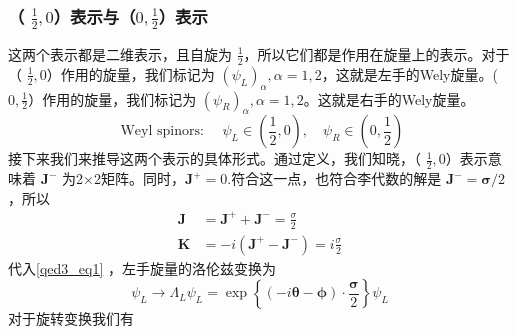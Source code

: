 \subsubsection{（ $\frac{1}{2},0$）表示与（$0,\frac{1}{2}$）表示}
这两个表示都是二维表示，且自旋为 $\frac{1}{2}$，所以它们都是作用在旋量上的表示。对于（ $\frac{1}{2},0$）作用的旋量，我们标记为 $\left(\psi_{L}\right)_{\alpha},\alpha=1,2$，这就是左手的Wely旋量。($0,\frac{1}{2}$）作用的旋量，我们标记为 $\left(\psi_{R}\right)_{\alpha},\alpha=1,2$。这就是右手的Wely旋量。
\begin{equation}
\text { Weyl spinors: } \quad \psi_{L} \in\left(\frac{1}{2}, 0\right), \quad \psi_{R} \in\left(0, \frac{1}{2}\right)
\end{equation}
接下来我们来推导这两个表示的具体形式。通过定义，我们知晓，（ $\frac{1}{2},0$）表示意味着 $\mathbf{J}^{-}$ 为2×2矩阵。同时，$\mathbf{J}^{+}=0$.符合这一点，也符合李代数的解是 $\mathbf{J}^{-}=\boldsymbol{\sigma} / 2$，所以
\begin{equation}
\begin{aligned}
\mathbf{J} &=\mathbf{J}^{+}+\mathbf{J}^{-}=\frac{\sigma}{2} \\
\mathbf{K} &=-i\left(\mathbf{J}^{+}-\mathbf{J}^{-}\right)=i \frac{\sigma}{2}
\end{aligned}
\end{equation}
代入\autoref{qed3_eq1} ，左手旋量的洛伦兹变换为
\begin{equation}
\psi_{L} \rightarrow \Lambda_{L} \psi_{L}=\exp \left\{(-i \boldsymbol{\theta}-\boldsymbol{\phi}) \cdot \frac{\boldsymbol{\sigma}}{2}\right\} \psi_{L}
\end{equation}
对于旋转变换我们有

